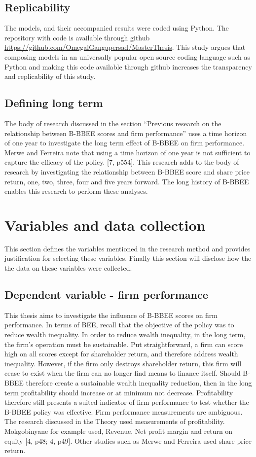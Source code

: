 \subsection{Replicability}
The models, and their accompanied results were coded using Python. The repository with code is available through github \url{https://github.com/OmegalGangapersad/MasterThesis}. This study argues that composing models in an universally popular open source coding language such as Python and making this code available through github increases the transparency and replicability of this study.
\subsection{Defining long term}
The body of research discussed in the section “Previous research on the relationship between B-BBEE scores and firm performance” uses a time horizon of one year to investigate the long term effect of B-BBEE on firm performance. Merwe and Ferreira note that using a time horizon of one year is not sufficient to capture the efficacy of the policy. [7, p554]. This research adds to the body of research by investigating the relationship between B-BBEE score and share price return, one, two, three, four and five years forward. The long history of B-BBEE enables this research to perform these analyses. 
\section{Variables and data collection}
This section defines the variables mentioned in the research method and provides justification for selecting these variables. Finally this section will disclose how the the data on these variables were collected.  
\subsection{Dependent variable - firm performance}
This thesis aims to investigate the influence of B-BBEE scores on firm performance. In terms of BEE, recall that the objective of the policy was to reduce wealth inequality. In order to reduce wealth inequality, in the long term, the firm’s operation must be sustainable. Put straightforward, a firm can score high on all scores except for shareholder return, and therefore address wealth inequality. However, if the firm only destroys shareholder return, this firm will cease to exist when the firm can no longer find means to finance itself. Should B-BBEE therefore create a sustainable wealth inequality reduction, then in the long term profitability should increase or at minimum not decrease. Profitability therefore still presents a suited indicator of firm performance to test whether the B-BBEE policy was effective. Firm performance measurements are ambiguous. The research discussed in the Theory used measurements of profitability. Mokgobinyane for example used, Revenue, Net profit margin and return on equity [4, p48; 4, p49]. Other studies such as Merwe and Ferreira used share price return. 

